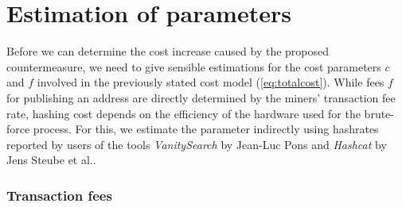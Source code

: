 \documentclass[a4paper,11pt,titlepage]{scrbook}
\begin{document}
\section{Estimation of parameters}\label{sec:parameters}



Before we can determine the cost increase caused by the proposed countermeasure, we need to give sensible estimations for the cost parameters $c$ and $f$ involved in the previously stated cost model (\ref{eq:totalcost}).
While fees $f$ for publishing an address are directly determined by the miners' transaction fee rate, hashing cost depends on the efficiency of the hardware used for the brute-force process.
For this, we estimate the parameter indirectly using hashrates reported by users of the tools \emph{VanitySearch} by Jean-Luc Pons \cite{vanitygen_2012} and \emph{Hashcat} by Jens Steube et al.\@ \cite{hashcat_2020}.

\subsubsection*{Transaction fees}
\end{document}
